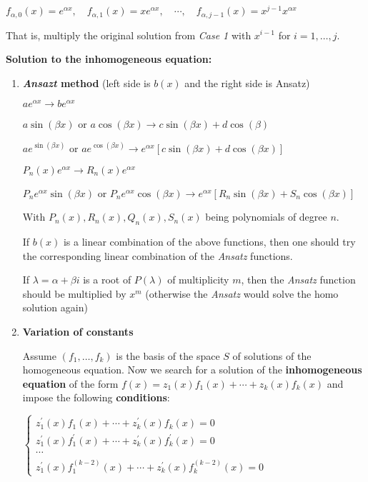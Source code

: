 \documentclass[]{article}
\newcommand{\hl}[1]{\mathversion{bold}\textbf{\textcolor{red!90!green}{#1}}\mathversion{normal}}
\begin{document}
\begin{multicols*}{3}
$f_{\alpha, 0}(x)=e^{\alpha x}, \quad f_{\alpha, 1}(x)=x e^{\alpha x}, \quad \cdots, \quad f_{\alpha, j-1}(x)=x^{j-1} x^{\alpha x}$

That is, multiply the original solution from \emph{Case 1} with
$x^{i-1}$ for $i = 1, \dots , j$.

\textbf{Solution to the inhomogeneous equation:}

\begin{enumerate}
\def\labelenumi{\arabic{enumi}.}
\item
  \textbf{\emph{Ansazt} method} (left side is $b(x)$ and the right
  side is Ansatz)

  $ae^{\alpha x} \rightarrow be^{\alpha x}$

  $a\sin(\beta x)$ or
  $a\cos(\beta x) \rightarrow c\sin(\beta x) + d\cos(\beta )$

  $ae^{\sin(\beta x)}$ or
  $ae^{\cos(\beta x)} \rightarrow e^{\alpha x}[c\sin(\beta x) + d\cos(\beta x)]$

  $P_n(x)e^{\alpha x} \rightarrow R_n(x) e^{\alpha x}$

  $P_ne^{\alpha x}\sin(\beta x)$ or
  $P_ne^{\alpha x}\cos(\beta x) \rightarrow e^{\alpha x}[R_n\sin(\beta x) + S_n\cos(\beta x)]$

  With $P_n(x), R_n(x), Q_n(x), S_n(x)$ being polynomials of degree
  $n$.

  If $b(x)$ is a linear combination of the above functions, then one
  should try the corresponding linear combination of the \emph{Ansatz}
  functions.

  If $\lambda = \alpha + \beta i$ is a root of $P(\lambda)$ of
  multiplicity $m$, then the \emph{Ansatz} function should be
  multiplied by $x^m$ (otherwise the \emph{Ansatz} would solve the
  homo solution again)
\item
  \textbf{Variation of constants}

  Assume $(f_1, \dots , f_k)$ is the basis of the space $S$ of
  solutions of the homogeneous equation. Now we search for a solution of
  the \hl{inhomogeneous equation} of the form
  $f(x)=z_{1}(x) f_{1}(x)+\cdots+z_{k}(x) f_{k}(x)$ and impose the
  following \hl{conditions}:

  $\left\{\begin{array}{l}z_{1}^{\prime}(x) f_{1}(x)+\cdots+z_{k}^{\prime}(x) f_{k}(x)=0 \\z_{1}^{\prime}(x) f_{1}^{\prime}(x)+\cdots+z_{k}^{\prime}(x) f_{k}^{\prime}(x)=0 \\\cdots \\z_{1}^{\prime}(x) f_{1}^{(k-2)}(x)+\cdots+z_{k}^{\prime}(x) f_{k}^{(k-2)}(x)=0\end{array}\right.$
\end{enumerate}


\end{multicols*}
\end{document}
